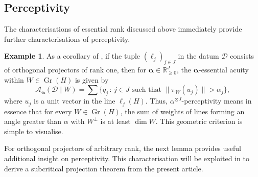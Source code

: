 \documentclass[a4paper,english]{amsart}
\theoremstyle{definition}
\newtheorem*{example}{Example}
\newcommand{\R}{\mathbb{R}}
\newcommand{\bba}{\boldsymbol{\alpha}}
\newcommand{\1}{\mathbbm{1}}
\newcommand{\sD} {{\mathscr D}}
\newcommand{\sA}{\mathscr{A}}
\DeclareMathOperator{\codim}{codim}
\newcommand{\norm}[1]{\lVert#1\rVert}   %
\DeclareMathOperator{\Id}{Id}
\DeclareMathOperator{\Gr}{Gr}
\DeclareMathOperator{\too}{to}
\begin{document}
\subsection{Perceptivity} \label{Sec-percep}


The characterisations of essential rank discussed above immediately provide further characterisations of perceptivity.

\begin{example}
As a corollary of ,  if the tuple $(\ell_j)_{j \in J}$ in the datum $\sD$ consists of orthogonal projectors of rank one, then for $\bba\in \R_{\geq0}
^J$, the $\bba$-essential acuity within $W \in \Gr(H)$ is given by
$$\sA_{\bba}(\sD \mid W)=\sum \{q_{j}\,:\, j \in J \text{ such that }\norm{\pi_W(u_j)} > \alpha_{j}\},$$
where $u_j$ is a unit vector in the line $\ell_j(H)$.
Thus, $\alpha^{\otimes J}$-perceptivity  means in essence that for every $W \in \Gr(H)$, the sum of weights of  lines forming an angle greater than $\alpha$ with $W^\perp$ is at least $\dim W$.
This geometric criterion is simple to visualise.
\end{example}

For orthogonal projectors of arbitrary rank, the next lemma provides  useful additional insight on perceptivity. This characterisation will be exploited in \cite{BH25-walks} to derive a subcritical projection theorem from the present article.
\end{document}
